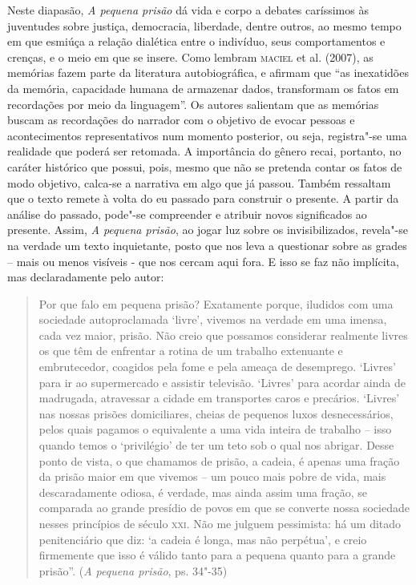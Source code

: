 \documentclass[11pt]{extarticle}
\begin{document}
Neste diapasão, \emph{A pequena prisão} dá vida e corpo a debates
caríssimos às juventudes sobre justiça, democracia, liberdade, dentre
outros, ao mesmo tempo em que esmiúça a relação dialética entre o
indivíduo, seus comportamentos e crenças, e o meio em que se insere.
Como lembram \textsc{maciel} et al. (2007), as memórias fazem parte da literatura
autobiográfica, e afirmam que ``as inexatidões da memória, capacidade
humana de armazenar dados, transformam os fatos em recordações por meio
da linguagem''. Os autores salientam que as memórias buscam as
recordações do narrador com o objetivo de evocar pessoas e
acontecimentos representativos num momento posterior, ou seja,
registra"-se uma realidade que poderá ser retomada. A importância do
gênero recai, portanto, no caráter histórico que possui, pois, mesmo que
não se pretenda contar os fatos de modo objetivo, calca-se a narrativa
em algo que já passou. Também ressaltam que o texto remete à volta do eu
passado para construir o presente. A partir da análise do passado,
pode"-se compreender e atribuir novos significados ao presente. Assim,
\emph{A
pequena prisão}, ao jogar luz sobre os invisibilizados, revela"-se
na verdade um texto inquietante, posto que nos leva a questionar sobre as
grades -- mais ou menos visíveis - que nos cercam aqui fora. E isso se
faz não implícita, mas declaradamente pelo autor:

\begin{quote}
Por que falo em pequena prisão? Exatamente porque, iludidos com
uma sociedade autoproclamada `livre', vivemos na verdade em uma
imensa, cada vez maior, prisão. Não creio que possamos considerar
realmente livres os que têm de enfrentar a rotina de um trabalho
extenuante e embrutecedor, coagidos pela fome e pela ameaça de
desemprego. `Livres' para ir ao supermercado e assistir televisão.
`Livres' para acordar ainda de madrugada, atravessar a cidade em
transportes caros e precários. `Livres' nas nossas prisões
domiciliares, cheias de pequenos luxos desnecessários, pelos quais
pagamos o equivalente a uma vida inteira de trabalho -- isso quando
temos o `privilégio' de ter um teto sob o qual nos abrigar. Desse
ponto de vista, o que chamamos de prisão, a cadeia, é apenas uma fração
da prisão maior em que vivemos -- um pouco mais pobre de vida, mais
descaradamente odiosa, é verdade, mas ainda assim uma fração, se
comparada ao grande presídio de povos em que se converte nossa sociedade
nesses princípios de século \textsc{xxi}. Não me julguem pessimista: há um ditado
penitenciário que diz: `a cadeia é longa, mas não perpétua', e creio
firmemente que isso é válido tanto para a pequena quanto para a grande
prisão''. (\emph{A
pequena prisão}, ps. 34"-35)
\end{quote}
\end{document}
